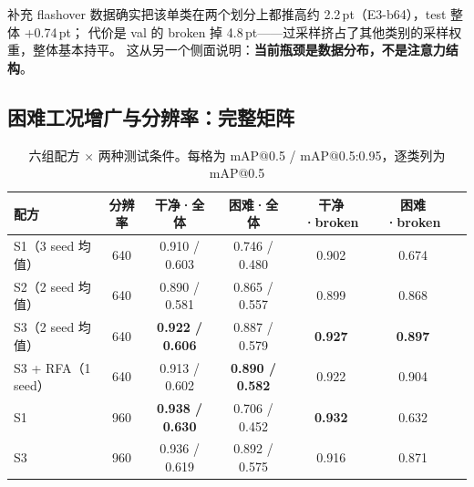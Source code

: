 \documentclass[UTF8,a4paper,11pt]{ctexart}
\begin{document}
补充 flashover 数据确实把该单类在两个划分上都推高约 2.2\,pt（E3-b64），test 整体 +0.74\,pt；
代价是 val 的 broken 掉 4.8\,pt——过采样挤占了其他类别的采样权重，整体基本持平。
这从另一个侧面说明：\textbf{当前瓶颈是数据分布，不是注意力结构}。

\subsection{困难工况增广与分辨率：完整矩阵}

\begin{table}[htbp]
\centering
\caption{六组配方 $\times$ 两种测试条件。每格为 mAP@0.5 / mAP@0.5:0.95，逐类列为 mAP@0.5}
\label{tab:matrix}
\setlength{\tabcolsep}{4pt}
\begin{tabular}{lcccccc}
\toprule
配方 & 分辨率 & 干净·全体 & 困难·全体 & 干净·broken & 困难·broken \\
\midrule
S1（3 seed 均值）   & 640 & 0.910 / 0.603 & 0.746 / 0.480 & 0.902 & 0.674 \\
S2（2 seed 均值）   & 640 & 0.890 / 0.581 & 0.865 / 0.557 & 0.899 & 0.868 \\
S3（2 seed 均值）   & 640 & \textbf{0.922 / 0.606} & 0.887 / 0.579 & \textbf{0.927} & \textbf{0.897} \\
S3 + RFA（1 seed）  & 640 & 0.913 / 0.602 & \textbf{0.890 / 0.582} & 0.922 & 0.904 \\
\midrule
S1                  & 960 & \textbf{0.938 / 0.630} & 0.706 / 0.452 & \textbf{0.932} & 0.632 \\
S3                  & 960 & 0.936 / 0.619 & 0.892 / 0.575 & 0.916 & 0.871 \\
\bottomrule
\end{tabular}
\end{table}
\end{document}
